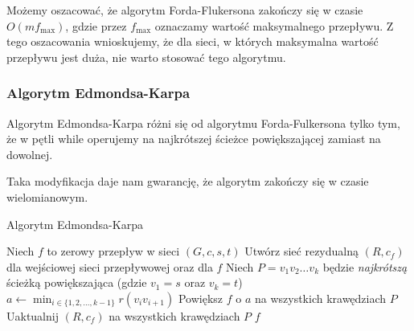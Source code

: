 Możemy oszacować, że algorytm Forda-Flukersona 
zakończy się w czasie $O(mf_{\max})$, gdzie 
przez $f_{\max}$ oznaczamy wartość maksymalnego przepływu. 
Z tego oszacowania wnioskujemy, że dla sieci, w których
maksymalna wartość przepływu jest duża, 
nie warto stosować tego algorytmu. 

\subsubsection{Algorytm Edmondsa-Karpa}
Algorytm Edmondsa-Karpa różni się od 
algorytmu Forda-Fulkersona tylko tym, że
w pętli while operujemy na najkrótszej ścieżce powiększającej
zamiast na dowolnej.

Taka modyfikacja daje nam gwarancję, że
algorytm zakończy się w czasie wielomianowym.

\begin{algorithm}[H]
	\caption{Algorytm Edmondsa-Karpa}\label{alg:edmonds-karp}
	\begin{algorithmic}[1]
		\State Niech $f$ to zerowy przepływ w sieci $(G,c,s,t)$
		\State Utwórz sieć rezydualną $(R, c_f)$ dla wejściowej 
		sieci przepływowej oraz dla $f$ 
		\State Niech $P = v_1v_2\dots v_k$ będzie \emph{najkrótszą}
		ścieżką powiększająca (gdzie $v_1 = s$ oraz $v_k = t$)
		\State $a \gets \min_{i \in \{1, 2, \dots, k-1\}} r(v_iv_{i+1})$
		\State Powiększ $f$ o $a$ na wszystkich krawędziach $P$
		\State Uaktualnij $(R, c_f)$ na wszystkich krawędziach $P$
		\EndWhile
		\State \Return $f$
		\EndProcedure
	\end{algorithmic}
\end{algorithm}



